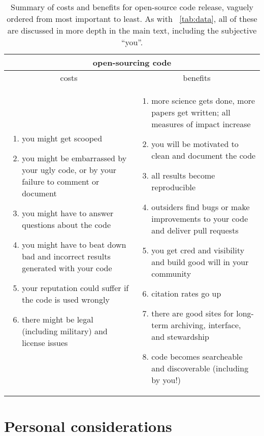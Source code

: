 \documentclass[12pt,twoside,pdftex]{article}
\begin{document}
\begin{table}%
\begin{tabular}{@{}p{\cwidth}|p{\cwidth}@{}}%
\multicolumn{2}{c}{\textbf{open-sourcing code}} \\ \hline
\multicolumn{1}{c|}{costs} & \multicolumn{1}{c}{benefits} \\ \hline
\begin{enumerate}\raggedright
\item you might get scooped
\item you might be embarrassed by your ugly code, or by your failure to comment or document
\item you might have to answer questions about the code
\item you might have to beat down bad and incorrect results generated with your code
\item your reputation could suffer if the code is used wrongly
\item there might be legal (including military) and license issues
\end{enumerate}&\begin{enumerate}\raggedright
\item more science gets done, more papers get written; all measures of impact increase
\item you will be motivated to clean and document the code
\item all results become reproducible
\item outsiders find bugs or make improvements to your code and deliver pull requests
\item you get cred and visibility and build good will in your community
\item citation rates go up
\item there are good sites for long-term archiving, interface, and stewardship
\item code becomes searcheable and discoverable (including by you!)
\end{enumerate}\end{tabular}
\caption{Summary of costs and benefits for open-source code release,
  vaguely ordered from most important to least. As with
  \tablename~\ref{tab:data}, all of these are discussed in more depth
  in the main text, including the subjective ``you''.\label{tab:code}}
\end{table}

\section{Personal considerations}
\end{document}
